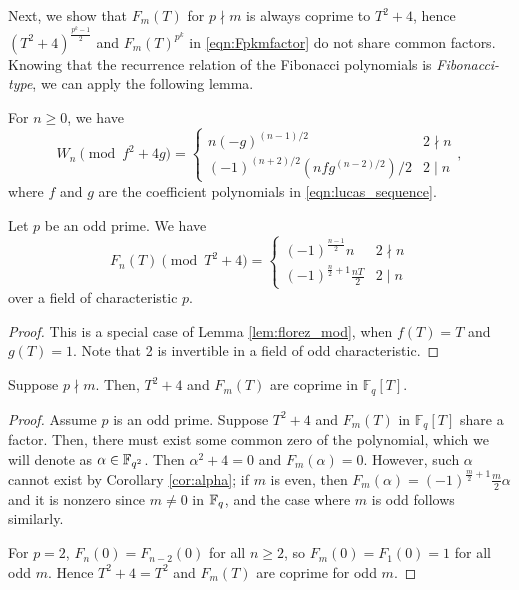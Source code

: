 Next, we show that $F_m(T)$ for $p \nmid m$ is always coprime to \(T^2 + 4\), hence $(T^2 + 4)^{\frac{p^k - 1}{2}}$ and $F_m(T)^{p^k}$ in \eqref{eqn:Fpkmfactor} do not share common factors. Knowing that the recurrence relation of the Fibonacci polynomials is \textit{Fibonacci-type}, we can apply the following lemma.

\begin{lemma}
\label{lem:florez_mod}
    For $n \ge 0$, we have
    \begin{equation}
        W_n \pmod{f^2 + 4g} = \begin{cases}
            n (-g)^{(n-1)/2} & 2 \nmid n \\
            (-1)^{(n+2)/2} (nfg^{(n-2)/2}) / 2 & 2 \mid n
        \end{cases}
        ,
    \end{equation}
    where $f$ and $g$ are the coefficient polynomials in \eqref{eqn:lucas_sequence}.
\end{lemma}

\begin{corollary}\label{cor:alpha}
    Let $p$ be an odd prime. We have
    \begin{equation}
        \label{eqn:Fnalpha}
        F_n(T) \pmod{T^2 + 4} = \begin{cases}
            (-1)^{\frac{n-1}{2}}n & 2 \nmid n \\
            (-1)^{\frac{n}{2} + 1} \frac{nT}{2} & 2 \mid n
        \end{cases}
    \end{equation}
    over a field of characteristic $p$.
\end{corollary}
\begin{proof}
    This is a special case of Lemma \ref{lem:florez_mod}, when $f(T) = T$ and $g(T) = 1$.
    Note that 2 is invertible in a field of odd characteristic.
\end{proof}

\begin{corollary}\label{cor:coprime}
     Suppose $p \nmid m$. Then, $T^2 + 4$ and $F_m(T)$ are coprime in $\mathbb{F}_q[T]$.
\end{corollary}
\begin{proof}
    Assume $p$ is an odd prime.
    Suppose $T^2 + 4$ and $F_m(T)$ in $\mathbb{F}_q[T]$ share a factor. Then, there must exist some common zero of the polynomial, which we will denote as $\alpha \in \mathbb{F}_{q^2}$.
    Then \(\alpha^2 + 4 = 0\) and \(F_m(\alpha) = 0\).
    However, such \(\alpha\) cannot exist by Corollary \ref{cor:alpha}; if \(m\) is even, then \(F_m(\alpha) = (-1)^{\frac{m}{2}+1} \frac{m}{2} \alpha\) and it is nonzero since \(m \ne 0\) in \(\mathbb{F}_q\), and the case where \(m\) is odd follows similarly.

    For \(p = 2\), \(F_{n}(0) = F_{n-2}(0)\) for all \(n \ge 2\), so \(F_m(0) = F_1(0) = 1\) for all odd \(m\). Hence \(T^2 + 4 = T^2\) and \(F_m(T)\) are coprime for odd \(m\).
\end{proof}


